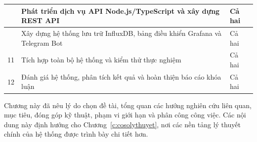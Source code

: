 \begin{longtable}{
|>{\centering\arraybackslash}p{0.8cm}
|>{\raggedright\arraybackslash}p{\dimexpr\textwidth-0.8cm-2.6cm-6\tabcolsep-4\arrayrulewidth\relax}
|>{\centering\arraybackslash}p{2.6cm}|
}
9 & Phát triển dịch vụ API Node.js/TypeScript và xây dựng REST API & Cả hai \\
\hline

10 & Xây dựng hệ thống lưu trữ InfluxDB, bảng điều khiển Grafana và Telegram Bot & Cả hai \\
\hline

11 & Tích hợp toàn bộ hệ thống và kiểm thử thực nghiệm & Cả hai \\
\hline

12 & Đánh giá hệ thống, phân tích kết quả và hoàn thiện báo cáo khóa luận & Cả hai \\
\hline

\end{longtable}
\endgroup

\vspace{0.5em}
Chương này đã nêu lý do chọn đề tài, tổng quan các hướng nghiên cứu liên quan, mục tiêu, đóng góp kỹ thuật, phạm vi giới hạn và phân công công việc. Các nội dung này định hướng cho Chương~\ref{c:cosolythuyet}, nơi các nền tảng lý thuyết chính của hệ thống được trình bày chi tiết hơn.
